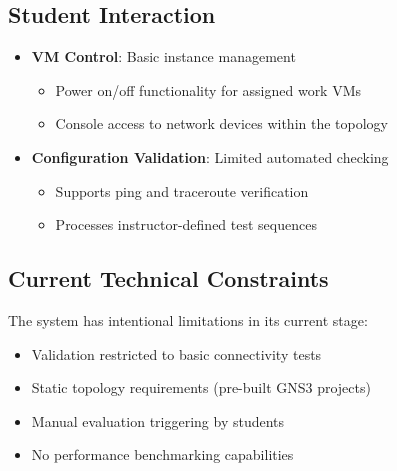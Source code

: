   \subsection{Student Interaction}
    \begin{itemize}
        \item \textbf{VM Control}: Basic instance management
        \begin{itemize}
            \item Power on/off functionality for assigned work VMs
            \item Console access to network devices within the topology
        \end{itemize}
        \item \textbf{Configuration Validation}: Limited automated checking
        \begin{itemize}
            \item Supports ping and traceroute verification
            \item Processes instructor-defined test sequences
        \end{itemize}
    \end{itemize}

  \subsection{Current Technical Constraints}
    The system has intentional limitations in its current stage:
    \begin{itemize}
        \item Validation restricted to basic connectivity tests
        \item Static topology requirements (pre-built GNS3 projects)
        \item Manual evaluation triggering by students
        \item No performance benchmarking capabilities
    \end{itemize}

